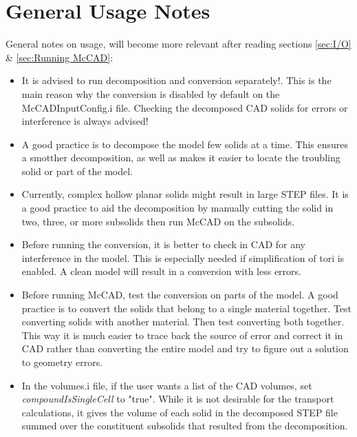 \documentclass[12pt, a4paper, titlepage]{article}
\begin{document}
\section{General Usage Notes} \label{Known Issues}
General notes on usage, will become more relevant after reading sections \ref{sec:I/O} \& \ref{sec:Running McCAD}:
\begin{itemize}
	\item It is advised to run decomposition and conversion separately!. This is the main reason why the conversion is disabled by default on the McCADInputConfig.i file. Checking the decomposed CAD solids for errors or interference is always advised! 
	\item A good practice is to decompose the model few solids at a time. This ensures a smotther decomposition, as well as makes it easier to locate the troubling solid or part of the model.
	\item Currently, complex hollow planar solids might result in large STEP files. It is a good practice to aid the decomposition by manually cutting the solid in two, three, or more subsolids then run McCAD on the subsolids.
	\item Before running the conversion, it is better to check in CAD for any interference in the model. This is especially needed if simplification of tori is enabled. A clean model will result in a conversion with less errors.
	\item Before running McCAD, test the conversion on parts of the model. A good practice is to convert the solids that belong to a single material together. Test converting solids with another material. Then test converting both together. This way it is much easier to trace back the source of error and correct it in CAD rather than converting the entire model and try to figure out a solution to geometry errors.
	\item In the volumes.i file, if the user wants a list of the CAD volumes, set \emph{compoundIsSingleCell} to "true". While it is not desirable for the transport calculations, it gives the volume of each solid in the decomposed STEP file summed over the constituent subsolids that resulted from the decomposition.
\end{itemize}

\end{document}

